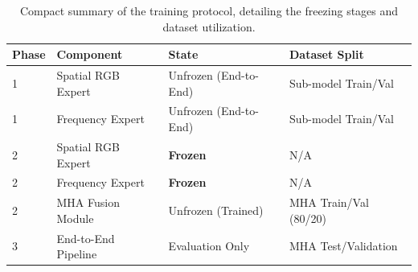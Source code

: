 \begin{table}[htbp]
\centering
\begin{tabular}{|l|l|l|l|}
\hline
\textbf{Phase} & \textbf{Component} & \textbf{State} & \textbf{Dataset Split} \\ \hline
1 & Spatial RGB Expert & Unfrozen (End-to-End) & Sub-model Train/Val \\ \hline
1 & Frequency Expert & Unfrozen (End-to-End) & Sub-model Train/Val \\ \hline
2 & Spatial RGB Expert & \textbf{Frozen} & N/A \\ \hline
2 & Frequency Expert & \textbf{Frozen} & N/A \\ \hline
2 & MHA Fusion Module & Unfrozen (Trained) & MHA Train/Val (80/20) \\ \hline
3 & End-to-End Pipeline & Evaluation Only & MHA Test/Validation \\ \hline
\end{tabular}
\caption{Compact summary of the training protocol, detailing the freezing stages and dataset utilization.}
\label{tab:training_summary}
\end{table}

